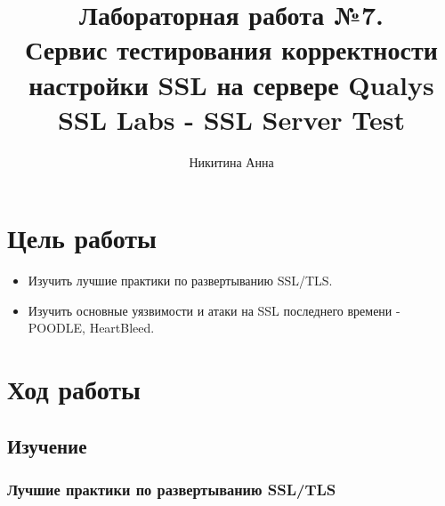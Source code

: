 \documentclass[10pt,a4paper]{report}
\author{Никитина Анна}
\title{Лабораторная работа №7.\\
	Сервис тестирования корректности настройки SSL на сервере Qualys SSL Labs - SSL Server Test}
\begin{document}
\maketitle
\tableofcontents
\pagebreak

\section{Цель работы}
\begin{itemize}
\item Изучить лучшие практики по развертыванию SSL/TLS.
\item Изучить основные уязвимости и атаки на SSL последнего времени - POODLE, HeartBleed.
\end{itemize}
\section{Ход работы}
\subsection{Изучение}
\subsubsection{Лучшие практики по развертыванию SSL/TLS}
\end{document}
